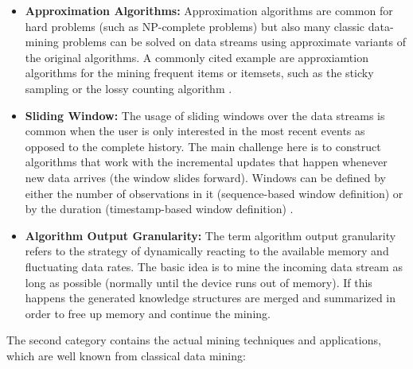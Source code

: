 \begin{itemize}
	\item \textbf{Approximation Algorithms:} Approximation algorithms are common for hard problems (such as NP-complete problems) but also many classic data-mining problems can be solved on data streams using approximate variants of the original algorithms. A commonly cited example are approxiamtion algorithms for the mining frequent items or itemsets, such as the sticky sampling or the lossy counting algorithm \cite{manku2002approximate}.
	\item \textbf{Sliding Window:} The usage of sliding windows over the data streams is common when the user is only interested in the most recent events as opposed to the complete history. The main challenge here is to construct algorithms that work with the incremental updates that happen whenever new data arrives (the window slides forward). Windows can be defined by either the number of observations in it (sequence-based window definition) or by the duration (timestamp-based window definition) \cite{gama2010knowledge}.
	\item \textbf{Algorithm Output Granularity:} The term algorithm output granularity refers to the strategy of dynamically reacting to the available memory and fluctuating data rates. The basic idea is to mine the incoming data stream as long as possible (normally until the device runs out of memory). If this happens the generated knowledge structures are merged and summarized in order to free up memory and continue the mining. 
\end{itemize}

The second category contains the actual mining techniques and applications, which are well known from classical data mining:

